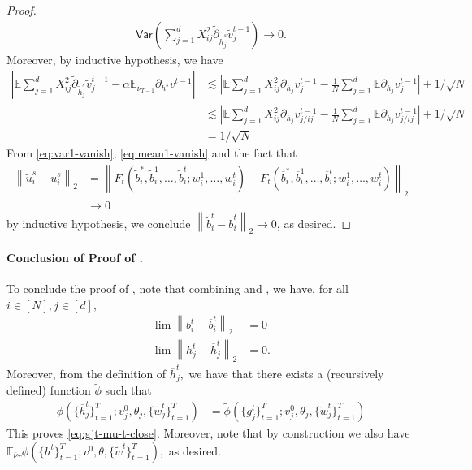 \documentclass{article}
\newcommand{\1}{\mathbbm{1}}
\newcommand{\norm}[1]{\left\lVert#1\right\rVert}
\theoremstyle{plain}
\theoremstyle{definition}
\theoremstyle{remark}
\newcommand{\E}{\mathbb{E}}
\newcommand{\Var}{\mathsf{Var}}
\begin{document}
\begin{proof}
    \begin{align}\label{eq:var1-vanish}
        \Var\left(\sum_{j=1}^d X_{ij}^2\tilde{\partial}_{\tilde{h}_j^s} \tilde{v}_j^{t-1} \right)   \to 0.
    \end{align}
    Moreover, by inductive hypothesis, we have 
    \begin{align}
        \left|\E\sum_{j=1}^d X_{ij}^2\tilde{\partial}_{\tilde{h}^s_j} \tilde{v}_j^{t-1}  -\alpha\E_{\nu_{T-1}} {\partial}_{{h}^s} {v}^{t-1} \right| &\lesssim \left|\E\sum_{j=1}^d X_{ij}^2{\partial}_{{h}_j} {v}_j^{t-1}  - \frac{1}{N}\sum_{j=1}^d \E {\partial}_{{h}_j} {v}_j^{t-1} \right|  + 1/\sqrt{N}\nonumber\\
        &\lesssim  \left|\E\sum_{j=1}^d X_{ij}^2{\partial}_{{h}_j} {v}_{j/ij}^{t-1}  - \frac{1}{N}\sum_{j=1}^d \E {\partial}_{{h}_j} {v}_{j/ij}^{t-1} \right|  + 1/\sqrt{N}\nonumber\\
        &= 1/\sqrt{N}\label{eq:mean1-vanish}
    \end{align}
    From \eqref{eq:var1-vanish}, \eqref{eq:mean1-vanish} and the fact that 
    \begin{align*}
        \norm{\tilde{u}_i^s - \overline{u}_i^s}_2 &= \norm{F_t( \tilde{b}_i^*,  \tilde{b}_i^1,\dots, \tilde{b}_i^t;w^1_i,\dots,w^t_i) - F_t( \overline{b}_i^*,  \overline{b}_i^1,\dots, \overline{b}_i^t;w^1_i,\dots,w^t_i)}_2\\
        &\to 0
    \end{align*}
    by inductive hypothesis, we conclude $\norm{\tilde{b}_i^t - \overline{b}_i^t}_2 \to 0$, as desired.
\end{proof}

\paragraph{Conclusion of Proof of .}

To conclude the proof of , note that combining  and , we have, for all $i \in [N],j\in [d],$
\begin{align*}
    \lim \norm{ b_i^t - \overline{b}_i^t } _2&= 0 \\
    \lim \norm{h_j^t - \overline{h}_j^t}_2 &= 0. 
\end{align*}
Moreover, from the definition of $\overline{h}_j^t,$ we have that there exists a (recursively defined) function $\tilde{\phi}$ such that
\begin{align*}
    \phi(\{\overline{h}_j^t\}_{t=1}^T;v_j^0,\theta_j,\{\tilde{w}_j^t\}_{t=1}^T) &= \tilde{\phi}(\{g_j^t\}_{t=1}^T;v_j^0,\theta_j,\{\tilde{w}_j^t\}_{t=1}^T)
\end{align*}
This proves \eqref{eq:gjt-mu-t-close}. Moreover, note that by construction we also have $\E_{\overline{\nu}_T} \phi( \{h^t\}_{t=1}^T;v^0,\theta,\{\tilde{w}^t\}_{t=1}^T),$ as desired.
\end{document}
